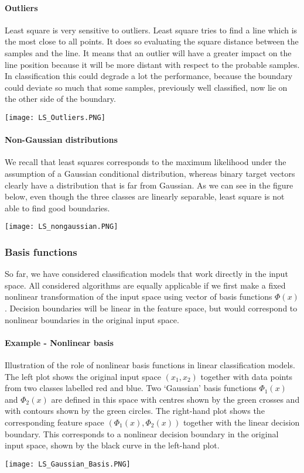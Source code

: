 \documentclass[main.tex]{subfiles}
\begin{document}
\paragraph{Outliers} Least square is very sensitive to outliers. Least square tries to find a line which is the most close to all points. It does so evaluating the square distance between the samples and the line. It means that an outlier will have a greater impact on the line position because it will be more distant with respect to the probable samples. In classification this could degrade a lot the performance, because the boundary could deviate so much that some samples, previously well classified, now lie on the other side of the boundary.
\begin{center}
    \texttt{[image: LS\_Outliers.PNG]}
\end{center}

\paragraph{Non-Gaussian distributions}
We recall that least squares corresponds to the maximum likelihood under the assumption of a Gaussian conditional distribution, whereas binary target vectors clearly have a distribution that is far from Gaussian. As we can see in the figure below, even though the three classes are linearly separable, least square is not able to find good boundaries.
\begin{center}
    \texttt{[image: LS\_nongaussian.PNG]}
\end{center}

\newpage
\subsubsection{Basis functions}
So far, we have considered classification models that work directly in the input space. All considered algorithms are equally applicable if we first make a fixed nonlinear transformation of the input space using vector of basis functions $\Phi(x)$. Decision boundaries will be linear in the feature space, but would correspond to nonlinear boundaries in the original input space.
\paragraph{Example - Nonlinear basis}
Illustration of the role of nonlinear basis functions in linear classification models. The left plot shows the original input space $(x_1, x_2)$ together with data points from two classes labelled red and blue. Two
‘Gaussian’ basis functions $\Phi_1(x)$ and $\Phi_2(x)$ are defined in this space with centres shown by the green crosses
and with contours shown by the green circles. The right-hand plot shows the corresponding feature space $(\Phi_1(x), \Phi_2(x))$ together with the linear decision boundary. This corresponds to a nonlinear decision boundary in the original input space, shown by the black curve in the left-hand plot.
\begin{center}
    \texttt{[image: LS\_Gaussian\_Basis.PNG]}
\end{center}
\end{document}
